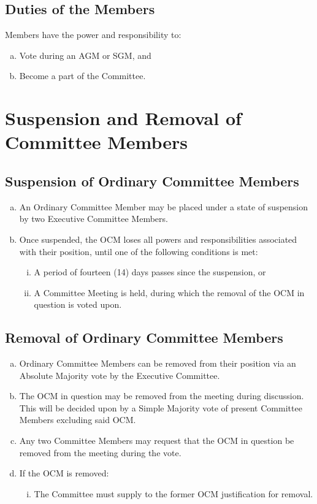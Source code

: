 \documentclass[a4paper,12pt]{article}
\begin{document}
\subsection{Duties of the Members}

Members have the power and responsibility to:

\begin{enumerate}[a)]
	\item Vote during an AGM or SGM, and
	\item Become a part of the Committee.
\end{enumerate}

\section{Suspension and Removal of Committee Members}

\subsection{Suspension of Ordinary Committee Members}

\begin{enumerate}[a)]
	\item An Ordinary Committee Member may be placed under a state of suspension by two Executive Committee Members.
	\item Once suspended, the OCM loses all powers and responsibilities associated with their position, until one of the following conditions is met:
	\begin{enumerate}[i)]
		\item A period of fourteen (14) days passes since the suspension, or
		\item A Committee Meeting is held, during which the removal of the OCM in question is voted upon.
	\end{enumerate}
\end{enumerate}

\subsection{Removal of Ordinary Committee Members}

\begin{enumerate}[a)]
	\item Ordinary Committee Members can be removed from their position via an Absolute Majority vote by the Executive Committee.
	\item The OCM in question may be removed from the meeting during discussion. This will be decided upon by a Simple Majority vote of present Committee Members excluding said OCM. 
	\item Any two Committee Members may request that the OCM in question be removed from the meeting during the vote.
	\item If the OCM is removed:
	\begin{enumerate}[i)]
		\item The Committee must supply to the former OCM justification for removal.
	\end{enumerate}
\end{enumerate}
\end{document}
